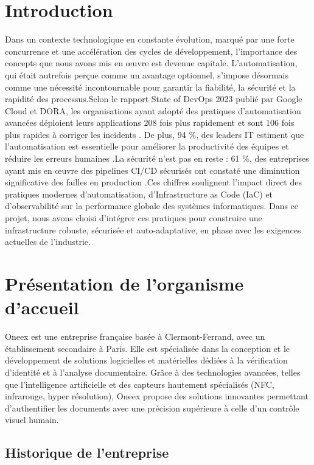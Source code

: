 \thispagestyle{mainmatter}

\section{Introduction}

Dans un contexte technologique en constante évolution, marqué par une forte concurrence et une accélération des cycles de développement, l’importance des concepts que nous avons mis en œuvre est devenue capitale. L’automatisation, qui était autrefois perçue comme un avantage optionnel, s’impose désormais comme une nécessité incontournable pour garantir la fiabilité, la sécurité et la rapidité des processus.Selon le rapport State of DevOps 2023 publié par Google Cloud et DORA, les organisations ayant adopté des pratiques d’automatisation avancées déploient leurs applications 208 fois plus rapidement et sont 106 fois plus rapides à corriger les incidents \cite{dora2023}. De plus, 94 \%, des leaders IT estiment que l’automatisation est essentielle pour améliorer la productivité des équipes et réduire les erreurs humaines \cite{redhat2023}.La sécurité n’est pas en reste : 61 \%, des entreprises ayant mis en œuvre des pipelines CI/CD sécurisés ont constaté une diminution significative des failles en production \cite{gitlab2023}.Ces chiffres soulignent l’impact direct des pratiques modernes d’automatisation, d’Infrastructure as Code (IaC) et d’observabilité sur la performance globale des systèmes informatiques. Dans ce projet, nous avons choisi d’intégrer ces pratiques pour construire une infrastructure robuste, sécurisée et auto-adaptative, en phase avec les exigences actuelles de l’industrie.

\section{Présentation de l'organisme d'accueil}

Oneex est une entreprise française basée à Clermont-Ferrand, avec un établissement secondaire à Paris. Elle est spécialisée dans la conception et le développement de solutions logicielles et matérielles dédiées à la vérification d’identité et à l’analyse documentaire. Grâce à des technologies avancées, telles que l’intelligence artificielle et des capteurs hautement spécialisés (NFC, infrarouge, hyper résolution), Oneex propose des solutions innovantes permettant d’authentifier les documents avec une précision supérieure à celle d’un contrôle visuel humain.

\subsection{Historique de l’entreprise}

